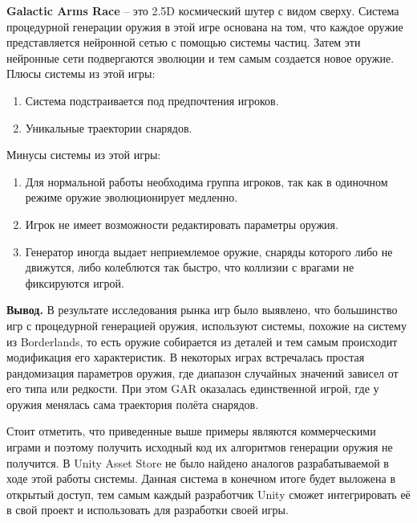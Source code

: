 \textbf{Galactic Arms Race} -- это 2.5D космический шутер с видом сверху. Система процедурной генерации оружия в этой игре основана на том, что каждое оружие представляется нейронной сетью с помощью системы частиц. Затем эти нейронные сети подвергаются эволюции и тем самым создается новое оружие.
%
\\Плюсы системы из этой игры:
\begin{enumerate}[--]
    \item Система подстраивается под предпочтения игроков.
    \item Уникальные траектории снарядов.
\end{enumerate}
%
Минусы системы из этой игры:
\begin{enumerate}[--]
    \item Для нормальной работы необходима группа игроков, так как в одиночном режиме оружие эволюционирует медленно.
    \item Игрок не имеет возможности редактировать параметры оружия.
    \item Генератор иногда выдает неприемлемое оружие, снаряды которого либо не движутся, либо колеблются так быстро, что коллизии с врагами не фиксируются игрой.
\end{enumerate}

\vspace{1mm}

\textbf{Вывод.} В результате исследования рынка игр было выявлено, что большинство игр с процедурной генерацией оружия, используют системы, похожие на систему из Borderlands, то есть оружие собирается из деталей и тем самым происходит модификация его характеристик. В некоторых играх встречалась простая рандомизация параметров оружия, где диапазон случайных значений зависел от его типа или редкости. При этом GAR оказалась единственной игрой, где у оружия менялась сама траектория полёта снарядов.

Стоит отметить, что приведенные выше примеры являются коммерческими играми и поэтому получить исходный код их алгоритмов генерации оружия не получится. В Unity Asset Store не было найдено аналогов разрабатываемой в ходе этой работы системы. Данная система в конечном итоге будет выложена в открытый доступ, тем самым каждый разработчик Unity сможет интегрировать её в свой проект и использовать для разработки своей игры.




